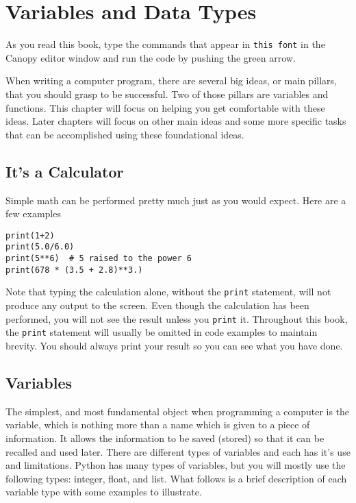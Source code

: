 \chapter{Variables and Data Types}
\label{chap:variablesDataTypes}


As you read this book, type the commands that
appear in \texttt{this font} in the Canopy editor window and run the code by
pushing the green arrow.


When writing a computer program, there are several big ideas, or main
pillars, that you should grasp to be successful.  Two of those pillars
are variables and functions. This chapter will focus on helping you
get comfortable with these ideas.  Later chapters will focus on other
main ideas and some more specific tasks that can be accomplished using
these foundational ideas.
\section{It's a Calculator}
Simple math can be performed pretty much just as you would
expect. Here are a few examples
\begin{Verbatim}
print(1+2)
print(5.0/6.0)
print(5**6)  # 5 raised to the power 6
print(678 * (3.5 + 2.8)**3.)
\end{Verbatim}
Note that typing the calculation alone, without the \texttt{print}
statement, will not produce any output to the screen.  Even though the
calculation has been performed, you will not see the result unless you
\texttt{print} it. Throughout this book, the \texttt{print}
statement will usually be omitted in code examples to maintain
brevity.  You should always print your result so you can see what you
have done.


\section{Variables}
The simplest, and most fundamental object when programming a computer
is the variable, which is nothing more than a name which is given to a
piece of information. It allows the information to be saved (stored)
so that it can be recalled and used later.   There
are different types of variables and each has it's use and
limitations.  Python has many types of variables, but you will mostly
use the following types: integer, float, and list.  What follows is a
brief description of each variable type with some examples to
illustrate.

